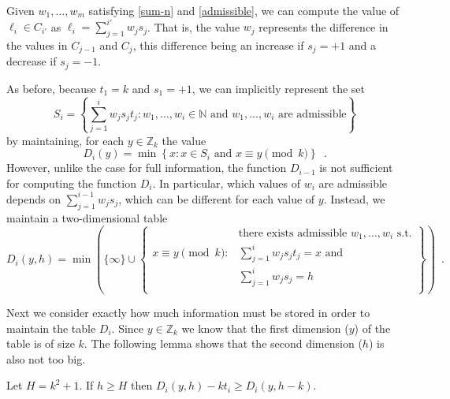 \documentclass[11pt]{patmorin}
\newcommand{\Z}{\mathbb{Z}}
\begin{document}
Given $w_1,\ldots,w_m$ satisfying \eqref{sum-n} and
\eqref{admissible}, we can compute the value of $\ell_i\in C_{i'}$ as 
$\ell_i =\sum_{j=1}^{i'} w_js_j$.  That is, the value $w_j$ represents the
difference in the values in $C_{j-1}$ and $C_j$, this difference being
an increase if $s_j=+1$ and a decrease if $s_j=-1$.

As before, because $t_1=k$ and $s_1=+1$, we can implicitly represent
the set 
\[
   S_i = \left\{\sum_{j=1}^i w_js_jt_j : 
	\mbox{$w_1,\ldots,w_i\in\mathbb{N}$ and  
		$w_1,\ldots,w_i$ are admissible} \right\}
\]
by maintaining, for each $y\in \Z_k$ the value 
\[
   D_i(y) = \min\left\{x : \mbox{$x\in S_i$ and $x\equiv y\pmod{k}$} \right\}
    \enspace .
\]
However, unlike the case for full information, the function $D_{i-1}$
is not sufficient for computing the function $D_{i}$.  In particular,
which values of $w_i$ are admissible depends on
$\sum_{j=1}^{i-1}w_js_j$, which can be different for each value of $y$.
Instead, we maintain a two-dimensional table
\[
   D_i(y,h) = \min\left(\{\infty\}\cup \left\{
    \begin{array}{ll}
          & \mbox{there exists admissible $w_1,\ldots,w_i$ s.t.} \\
        \mbox{$x\equiv y\pmod{k}$} : & \mbox{$\sum_{j=1}^i w_js_jt_j = x$ and} \\
          & \mbox{$\sum_{j=1}^i w_js_j = h$} \\
          
    \end{array}
    \right\}\right)
    \enspace .
\]

Next we consider exactly how much information must be stored in order
to maintain the table $D_i$. Since $y\in \mathbb{Z}_k$ we know that
the first dimension ($y$) of the table is of size $k$. The following
lemma shows that the second dimension ($h$) is also not too big.

\begin{lem}
Let $H=k^2+1$.  If $h\ge H$ then $D_i(y,h) - kt_i \ge D_i(y,h-k)$.
\end{lem}
\end{document}
